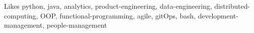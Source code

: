 

\begin{cvskills}

  \cvskill
    {Likes} %
    {python, java, analytics, product-engineering, data-engineering, distributed-computing, OOP, functional-programming, agile, gitOps, bash, development-management, people-management} %


\end{cvskills}
